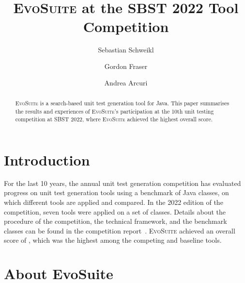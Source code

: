 \documentclass[sigconf]{acmart}
\newcommand{\EVOSUITE}{\textsc{EvoSuite}\xspace}
\begin{document}
% 

\title{\EVOSUITE at the SBST 2022 Tool Competition}
 

\author{Sebastian Schweikl}

\author{Gordon Fraser}

\author{Andrea Arcuri}

\begin{abstract}
  \EVOSUITE is a search-based unit test generation tool for Java. This paper summarises the results and experiences of \EVOSUITE's participation at the 10th unit testing competition at SBST 2022, where \EVOSUITE achieved the highest overall score.
\end{abstract}

\maketitle

\section{Introduction}
%
For the last 10 years, the annual unit test generation competition has
evaluated progress on unit test generation tools using a benchmark of Java
classes, on which different tools are applied and compared. In the 2022 edition
of the competition, seven tools were applied on a set of \cuts classes. Details
about the procedure of the competition, the technical framework, and the
benchmark classes can be found in the competition
report~\cite{SBST-toolcomp22}. \EVOSUITE achieved an overall score of \score,
which was the highest among the competing and baseline tools.


\section{About EvoSuite}
\end{document}
